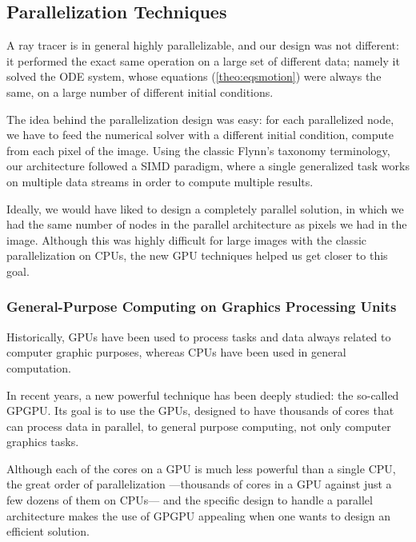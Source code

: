 \subsection{Parallelization Techniques}
\label{sec:parallel}

A ray tracer is in general highly parallelizable, and our design was not different: it performed the exact same operation on a large set of different data; namely it solved the \ac{ODE} system, whose equations (\autoref{theo:eqsmotion}) were always the same, on a large number of different initial conditions.

The idea behind the parallelization design was easy: for each parallelized node, we have to feed the numerical solver with a different initial condition, compute from each pixel of the image. Using the classic Flynn's taxonomy \cite{flynn72} terminology, our architecture followed a \ac{SIMD} paradigm, where a single generalized task works on multiple data streams in order to compute multiple results.

Ideally, we would have liked to design a completely parallel solution, in which we had the same number of nodes in the parallel architecture as pixels we had in the image. Although this was highly difficult for large images with the classic parallelization on \acp{CPU}, the new \ac{GPU} techniques helped us get closer to this goal.

\subsubsection*{General-Purpose Computing on Graphics Processing Units}

Historically, \acp{GPU} have been used to process tasks and data always related to computer graphic purposes, whereas \acp{CPU} have been used in general computation.

In recent years, a new powerful technique has been deeply studied: the so-called \ac{GPGPU}. Its goal is to use the \acp{GPU}, designed to have thousands of cores that can process data in parallel, to general purpose computing, not only computer graphics tasks.

Although each of the cores on a \ac{GPU} is much less powerful than a single \ac{CPU}, the great order of parallelization ---thousands of cores in a \ac{GPU} against just a few dozens of them on \acp{CPU}--- and the specific design to handle a parallel architecture makes the use of \ac{GPGPU} appealing when one wants to design an efficient solution.

